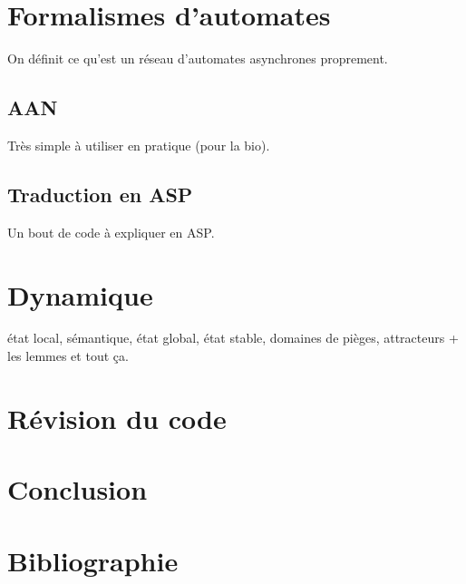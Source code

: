 \documentclass[12pt,a4paper]{article}
\begin{document}
\section{Formalismes d'automates}
On définit ce qu'est un réseau d'automates asynchrones proprement.
	\subsection{AAN}
	Très simple à utiliser en pratique (pour la bio).
	\subsection{Traduction en ASP}
	Un bout de code à expliquer en ASP.

\section{Dynamique}
état local, sémantique, état global, état stable, domaines de pièges,  attracteurs + les lemmes et tout ça.

\section{Révision du code}

\section{Conclusion}

\section{Bibliographie}
\end{document}
